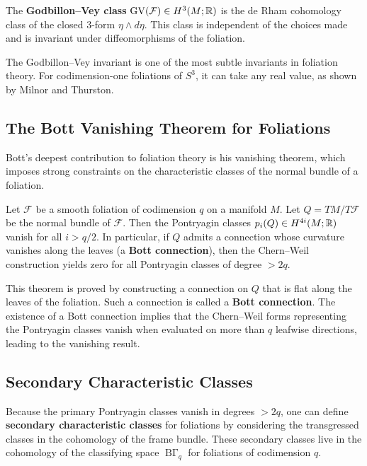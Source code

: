 \begin{definition}
The \textbf{Godbillon--Vey class} \(\operatorname{GV}(\mathcal{F}) \in H^3(M; \mathbb{R})\) is the de Rham cohomology class of the closed 3-form \(\eta \wedge d\eta\). This class is independent of the choices made and is invariant under diffeomorphisms of the foliation.
\end{definition}

The Godbillon--Vey invariant is one of the most subtle invariants in foliation theory. For codimension-one foliations of \(S^3\), it can take any real value, as shown by Milnor and Thurston.

\subsection{The Bott Vanishing Theorem for Foliations}

Bott's deepest contribution to foliation theory is his vanishing theorem, which imposes strong constraints on the characteristic classes of the normal bundle of a foliation.

\begin{theorem}
Let \(\mathcal{F}\) be a smooth foliation of codimension \(q\) on a manifold \(M\). Let \(Q = TM / T\mathcal{F}\) be the normal bundle of \(\mathcal{F}\). Then the Pontryagin classes \(p_i(Q) \in H^{4i}(M; \mathbb{R})\) vanish for all \(i > q/2\). In particular, if \(Q\) admits a connection whose curvature vanishes along the leaves (a \textbf{Bott connection}), then the Chern--Weil construction yields zero for all Pontryagin classes of degree \(> 2q\).
\end{theorem}

This theorem is proved by constructing a connection on \(Q\) that is flat along the leaves of the foliation. Such a connection is called a \textbf{Bott connection}. The existence of a Bott connection implies that the Chern--Weil forms representing the Pontryagin classes vanish when evaluated on more than \(q\) leafwise directions, leading to the vanishing result.

\subsection{Secondary Characteristic Classes}

Because the primary Pontryagin classes vanish in degrees \(> 2q\), one can define \textbf{secondary characteristic classes} for foliations by considering the transgressed classes in the cohomology of the frame bundle. These secondary classes live in the cohomology of the classifying space \(\operatorname{B\Gamma}_q\) for foliations of codimension \(q\).

